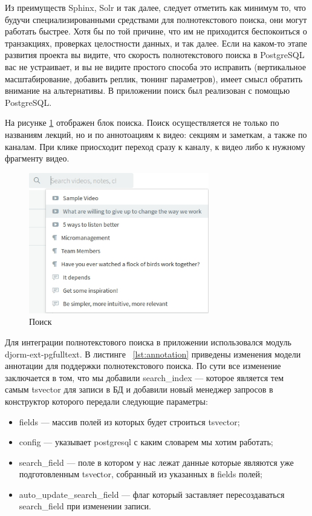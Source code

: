 Из преимуществ Sphinx, Solr и так далее, следует отметить как минимум то, что будучи специализированными
средствами для полнотекстового поиска, они могут работать быстрее. Хотя бы по той причине, что им не приходится
беспокоиться о транзакциях, проверках целостности данных, и так далее. Если на каком-то этапе развития проекта
вы видите, что скорость полнотекстового поиска в PostgreSQL вас не устраивает, и вы не видите простого способа
это исправить (вертикальное масштабирование, добавить реплик, тюнинг параметров), имеет смысл обратить внимание
на альтернативы. В приложении поиск был реализован с помощью PostgreSQL.

На рисунке \ref{search} отображен блок поиска. Поиск осуществляется не только по названиям лекций,
но и по аннотоациям к видео: секциям и заметкам, а также по каналам. При клике приосходит переход
сразу к каналу, к видео либо к нужному фрагменту видео.

\begin{figure}[H]
  \centering
  \includegraphics[width=0.7\textwidth]{images/search.jpg}
  \caption{Поиск}\label{search}
\end{figure}

Для интеграции полнотекстового поиска в приложении использовался модуль djorm-ext-pgfulltext. В листинге ~\ref{lst:annotation}
приведены изменения модели аннотации для поддержки полнотекстового поиска. По сути все изменение заключается в том,
что мы добавили search\_index — которое является тем самым tsvector для записи в БД и добавили
новый менеджер запросов в конструктор которого передали следующие параметры:

\begin{itemize}[wide,topsep=0pt]
  \itemsep0em
  \item fields — массив полей из которых будет строиться tsvector;
  \item config — указывает postgresql с каким словарем мы хотим работать;
  \item search\_field — поле в котором у нас лежат данные которые являются уже подготовленным tsveсtor, собранный из указанных в fields полей;
  \item auto\_update\_search\_field — флаг который заставляет пересоздаваться\\ search\_field при изменении записи.
\end{itemize}

